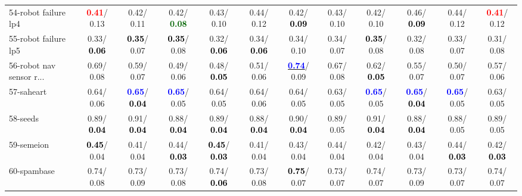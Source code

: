 \begin{table}[h]
\begin{center}
{\begin{tabular}{lc|c|c|c|c|c|c|c|c|c|c}
54-robot failure lp4 & \textcolor{red}{\textbf{  0.41}}/  0.13 &   0.42/  0.11 &   0.42/\textcolor{darkgreen}{\textbf{  0.08}} &   0.43/  0.10 &   0.44/  0.12 &   0.42/\textcolor{black}{\textbf{  0.09}} &   0.43/  0.10 &   0.42/  0.10 &   0.46/\textcolor{black}{\textbf{  0.09}} &   0.44/  0.12 & \textcolor{red}{\textbf{  0.41}}/  0.12 \\
55-robot failure lp5 &   0.33/\textcolor{black}{\textbf{  0.06}} & \textcolor{black}{\textbf{  0.35}}/  0.07 & \textcolor{black}{\textbf{  0.35}}/  0.08 &   0.32/\textcolor{black}{\textbf{  0.06}} &   0.34/\textcolor{black}{\textbf{  0.06}} &   0.34/  0.10 &   0.34/  0.07 & \textcolor{black}{\textbf{  0.35}}/  0.08 &   0.32/  0.08 &   0.33/  0.07 &   0.31/  0.08 \\
56-robot nav sensor r... &   0.69/  0.08 &   0.59/  0.07 &   0.49/  0.06 &   0.48/\textcolor{black}{\textbf{  0.05}} &   0.51/  0.06 & \underline{\textcolor{blue}{\textbf{  0.74}}}/  0.09 &   0.67/  0.08 &   0.62/\textcolor{black}{\textbf{  0.05}} &   0.55/  0.07 &   0.50/  0.07 &   0.57/  0.06 \\
57-saheart &   0.64/  0.06 & \textcolor{blue}{\textbf{  0.65}}/\textcolor{black}{\textbf{  0.04}} & \textcolor{blue}{\textbf{  0.65}}/  0.05 &   0.64/  0.05 &   0.64/  0.06 &   0.64/  0.05 &   0.63/  0.05 & \textcolor{blue}{\textbf{  0.65}}/  0.05 & \textcolor{blue}{\textbf{  0.65}}/\textcolor{black}{\textbf{  0.04}} & \textcolor{blue}{\textbf{  0.65}}/  0.05 &   0.63/  0.05 \\
58-seeds &   0.89/\textcolor{black}{\textbf{  0.04}} &   0.91/\textcolor{black}{\textbf{  0.04}} &   0.88/\textcolor{black}{\textbf{  0.04}} &   0.89/\textcolor{black}{\textbf{  0.04}} &   0.88/\textcolor{black}{\textbf{  0.04}} &   0.90/\textcolor{black}{\textbf{  0.04}} &   0.89/  0.05 &   0.91/\textcolor{black}{\textbf{  0.04}} &   0.88/\textcolor{black}{\textbf{  0.04}} &   0.88/  0.05 &   0.89/  0.05 \\
59-semeion & \textcolor{black}{\textbf{  0.45}}/  0.04 &   0.41/  0.04 &   0.44/\textcolor{black}{\textbf{  0.03}} & \textcolor{black}{\textbf{  0.45}}/\textcolor{black}{\textbf{  0.03}} &   0.41/  0.04 &   0.43/  0.04 &   0.44/  0.04 &   0.42/  0.04 &   0.43/  0.04 &   0.44/\textcolor{black}{\textbf{  0.03}} &   0.42/\textcolor{black}{\textbf{  0.03}} \\
60-spambase &   0.74/  0.08 &   0.73/  0.09 &   0.73/  0.08 &   0.74/\textcolor{black}{\textbf{  0.06}} &   0.73/  0.08 & \textcolor{black}{\textbf{  0.75}}/  0.07 &   0.73/  0.07 &   0.74/  0.07 &   0.73/  0.09 &   0.73/  0.07 &   0.74/  0.07 \\ \hline

\end{tabular}}
\end{center}
\end{table}
